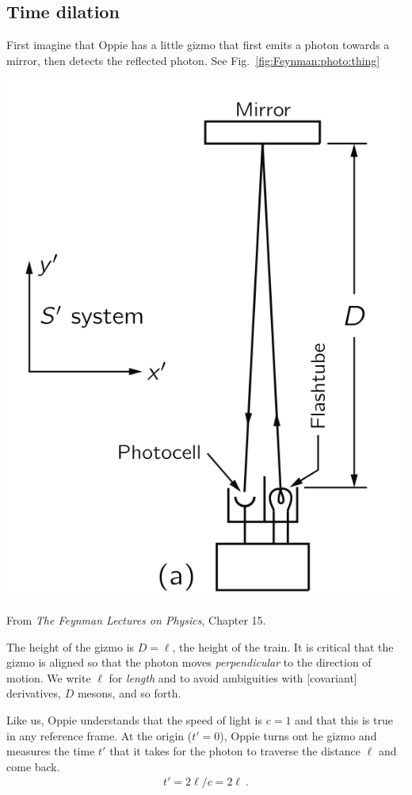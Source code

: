 \documentclass[12pt, oneside]{report}    %
\begin{document}
\begin{subappendices}
\subsection{Time dilation}

First imagine that Oppie has a little gizmo that first emits a photon towards a mirror, then detects the reflected photon. See Fig.~\ref{fig:Feynman:photo:thing}
\begin{marginfigure}%
    \includegraphics[width=.8\textwidth]{figures/FeynmanLec15_photodet.png}
    \caption{From \emph{The Feynman Lectures on Physics}, Chapter 15.}
    \label{fig:Feynman:photo:thing}
\end{marginfigure}
The height of the gizmo is $D = \ell$, the height of the train. It is critical that the gizmo is aligned so that the photon moves \emph{perpendicular} to the direction of motion. We write $\ell$ for \emph{length} and to avoid ambiguities with [covariant] derivatives, $D$ mesons, and so forth. 

Like us, Oppie understands that the speed of light is $c=1$ and that this is true in any reference frame. At the origin ($t'=0$), Oppie turns ont he gizmo and measures the time $t'$ that it takes for the photon to traverse the distance $\ell$ and come back. 
\begin{align}
     t' = 2\ell/c = 2\ell \ .
     \label{eq:Feynman:train:updown}
\end{align}


\end{subappendices}
\end{document}
